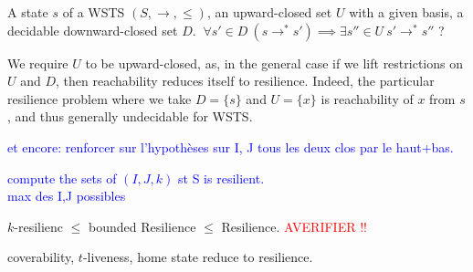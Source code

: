 {A state $s$ of a WSTS $(S,\rightarrow, \leq)$, an upward-closed set $U$ with a given basis, a decidable downward-closed set $D$.}
{$ ~ \forall s' \in D ~ (s \rightarrow^* s') \implies \exists s'' \in U ~ s' \rightarrow^{*} s''$ ?\newline}


\begin{remark} 
We require $U$ to be upward-closed, as, in the general case if we lift restrictions on $U$ and $D$, then reachability reduces itself to resilience. Indeed, the particular resilience problem where we take $D = \{s\}$ and $U = \{x\}$ is reachability of $x$ from $s$, and thus generally undecidable for WSTS. 
\end{remark}

\textcolor{blue}{
et encore: renforcer sur l'hypothèses sur I, J tous les deux clos par le haut+bas.
}

\textcolor{blue}{
compute the sets of $(I,J,k)$ st S is resilient.\\
max des I,J possibles \\
}

\begin{remark} 
$k$-resilienc $\leq$ bounded Resilience $\leq$ Resilience.  \textcolor{red}{AVERIFIER !!}
\end{remark}


\begin{proposition}\label{reductions}
coverability, $t$-liveness, home state 
 reduce to resilience.
\end{proposition}



